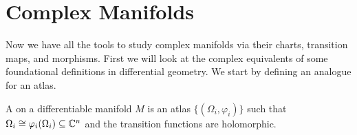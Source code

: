 \section{Complex Manifolds}
Now we have all the tools to study complex manifolds via their charts, transition
maps, and morphisms. First we will look at the complex equivalents of some foundational
definitions in differential geometry. We start by defining an analogue for an atlas.

\begin{definition}
    A  on a differentiable manifold $M$ is an atlas
    $\{(\Omega_i, \varphi_i)\}$ such that $\Omega_i \cong \varphi_i(\Omega_i) \subseteq
    \mathbb{C}^n$ and the transition functions are holomorphic.
\end{definition}

\vspace{.5cm}


